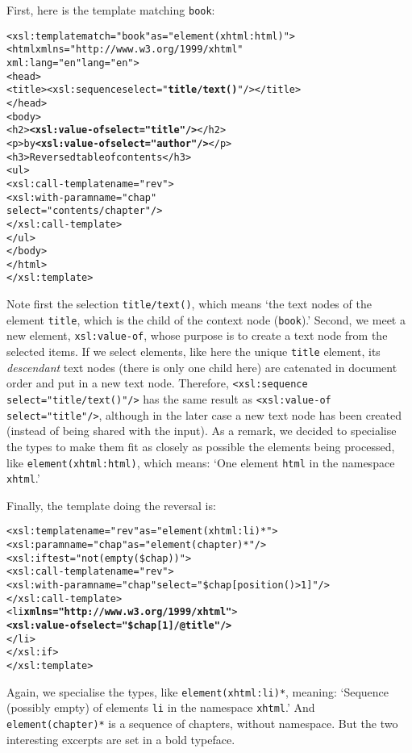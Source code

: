 \noindent First, here is the template matching \texttt{book}:
\begin{alltt}
  <xsl:template match="book" as="element(xhtml:html)">
    <html xmlns="http://www.w3.org/1999/xhtml"
          xml:lang="en" lang="en">
      <head>
        <title><xsl:sequence select="\textbf{title/text()}"/></title>
      </head>
      <body>
        <h2>\textbf{<xsl:value-of select="title"/>}</h2>
        <p>by \textbf{<xsl:value-of select="author"/>}</p>
        <h3>Reversed table of contents</h3>
        <ul>
          <xsl:call-template name="rev">
            <xsl:with-param name="chap"
                            select="contents/chapter"/>
          </xsl:call-template>
        </ul>
      </body>
    </html>
  </xsl:template>
\end{alltt}
Note first the selection \texttt{title/text()}, which means `the text
nodes of the element \texttt{title}, which is the child of the context
node (\texttt{book}).' Second, we meet a new \XSLT element,
\texttt{xsl:value-of}, whose purpose is to create a text node from the
selected items. If we select elements, like here the unique
\texttt{title} element, its \emph{descendant} text nodes (there is
only one child here) are catenated in document order and put in a new
text node. Therefore, \texttt{<xsl:sequence select="title/text()"/>}
has the same result as \texttt{<xsl:value-of select="title"/>},
although in the later case a new text node has been created (instead
of being shared with the input). As a remark, we decided to specialise
the types to make them fit as closely as possible the elements being
processed, like \texttt{element(xhtml:html)}, which means: `One
element \texttt{html} in the namespace \texttt{xhtml}.'

Finally, the template doing the reversal is:
\begin{alltt}
  <xsl:template name="rev" as="element(xhtml:li)*">
    <xsl:param name="chap" as="element(chapter)*"/>
    <xsl:if test="not(empty(\$chap))">
      <xsl:call-template name="rev">
        \!\!<xsl:with-param name="chap"\!\! select="\$chap[position()>1]"/>
      </xsl:call-template>
      <li \textbf{xmlns="http://www.w3.org/1999/xhtml"}>
        \textbf{<xsl:value-of select="\$chap[1]/@title"/>}
      </li>
    </xsl:if>
  </xsl:template>
\end{alltt}
Again, we specialise the types, like \texttt{element(xhtml:li)*},
meaning: `Sequence (possibly empty) of elements \texttt{li} in the
namespace \texttt{xhtml}.' And \texttt{element(chapter)*} is a
sequence of chapters, without namespace. But the two interesting
excerpts are set in a bold typeface.


